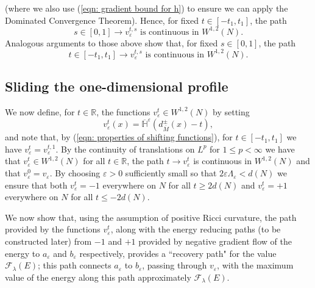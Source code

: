 \documentclass[11pt]{article}
\begin{document}
(where we also use (\ref{eqn: gradient bound for h}) to ensure we can apply the Dominated Convergence Theorem). Hence, for fixed $t \in [-t_1,t_1]$, the path
\begin{equation}\label{eqn: sliding functions cts path in s}
  s \in [0,1] \rightarrow v^{t,s}_\varepsilon \text{ is continuous in } W^{1,2}(N).
\end{equation}
Analogous arguments to those above show that, for fixed $s \in [0,1]$, the path
\begin{equation}\label{eqn: sliding functions cts path in t}
   t \in [-t_1,t_1] \rightarrow v^{t,s}_\varepsilon \text{ is continuous in } W^{1,2}(N).
\end{equation}


\subsection{Sliding the one-dimensional profile}\label{subsec: sliding the one-dimensional profile on M}

We now define, for $t \in \mathbb{R}$, the functions $v^t_\varepsilon \in W^{1,2}(N)$ by setting
\begin{equation*}
    v^t_\varepsilon(x) = 
\overline{\mathbb{H}}^\varepsilon ( d^\pm_{\overline{M}}(x) - t),
\end{equation*}
and note that, by (\ref{eqn: properties of shifting functions}), for $t \in [-t_1,t_1]$ we have $v^t_\varepsilon = v^{t,1}_\varepsilon$. By the continuity of translations on $L^p$ for $1 \leq p < \infty$ we have that $v^t_\varepsilon \in W^{1,2}(N)$ for all $t \in \mathbb{R}$, the path $t \rightarrow v^t_\varepsilon$ is continuous in $W^{1,2}(N)$ and that $v^0_\varepsilon = v_\varepsilon$. By choosing $\varepsilon > 0$ sufficiently small so that $2 \varepsilon \Lambda_\varepsilon < d(N)$ we ensure that both $v^t_\varepsilon = -1$ everywhere on $N$ for all $t \geq 2d(N)$ and $v^t_\varepsilon = +1$ everywhere on $N$ for all $t \leq -2d(N)$.

\bigskip

We now show that, using the assumption of positive Ricci curvature, the path provided by the functions $v^t_\varepsilon$, along with the energy reducing paths (to be constructed later) from $-1$ and $+1$ provided by negative gradient flow of the energy to $a_\varepsilon$ and $b_\varepsilon$ respectively, provides a “recovery path" for the value $\mathcal{F}_\lambda(E)$; this path connects $a_\varepsilon$ to $b_\varepsilon$, passing through $v_\varepsilon$, with the maximum value of the energy along this path approximately $\mathcal{F}_\lambda(E)$.
\end{document}
